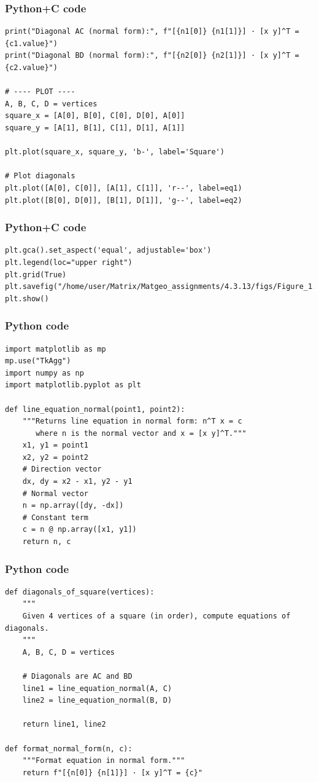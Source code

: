 \documentclass{beamer}
\begin{document}
\begin{frame}[fragile]
    \frametitle{Python+C code}

    \begin{lstlisting}
print("Diagonal AC (normal form):", f"[{n1[0]} {n1[1]}] · [x y]^T = {c1.value}")
print("Diagonal BD (normal form):", f"[{n2[0]} {n2[1]}] · [x y]^T = {c2.value}")

# ---- PLOT ----
A, B, C, D = vertices
square_x = [A[0], B[0], C[0], D[0], A[0]]
square_y = [A[1], B[1], C[1], D[1], A[1]]

plt.plot(square_x, square_y, 'b-', label='Square')

# Plot diagonals
plt.plot([A[0], C[0]], [A[1], C[1]], 'r--', label=eq1)
plt.plot([B[0], D[0]], [B[1], D[1]], 'g--', label=eq2)

    \end{lstlisting}
\end{frame}

\begin{frame}[fragile]
    \frametitle{Python+C code}

    \begin{lstlisting}
plt.gca().set_aspect('equal', adjustable='box')
plt.legend(loc="upper right")
plt.grid(True)
plt.savefig("/home/user/Matrix/Matgeo_assignments/4.3.13/figs/Figure_1.png")
plt.show()
    \end{lstlisting}
\end{frame}


\begin{frame}[fragile]
    \frametitle{Python code}

    \begin{lstlisting}
import matplotlib as mp
mp.use("TkAgg")
import numpy as np
import matplotlib.pyplot as plt

def line_equation_normal(point1, point2):
    """Returns line equation in normal form: n^T x = c
       where n is the normal vector and x = [x y]^T."""
    x1, y1 = point1
    x2, y2 = point2
    # Direction vector
    dx, dy = x2 - x1, y2 - y1
    # Normal vector
    n = np.array([dy, -dx])
    # Constant term
    c = n @ np.array([x1, y1])
    return n, c
    \end{lstlisting}
\end{frame}

\begin{frame}[fragile]
    \frametitle{Python code}

    \begin{lstlisting}
def diagonals_of_square(vertices):
    """
    Given 4 vertices of a square (in order), compute equations of diagonals.
    """
    A, B, C, D = vertices
    
    # Diagonals are AC and BD
    line1 = line_equation_normal(A, C)
    line2 = line_equation_normal(B, D)
    
    return line1, line2

def format_normal_form(n, c):
    """Format equation in normal form."""
    return f"[{n[0]} {n[1]}] · [x y]^T = {c}"

    \end{lstlisting}
\end{frame}
\end{document}
